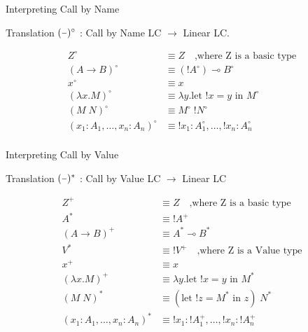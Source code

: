 \documentclass[10pt]{beamer}
\newcommand{\lam}[2]{\lambda #1 . #2}
\newcommand{\llet}[3]{\text{let }  ! #1 = #2 \text{ in } #3}
\newcommand{\app}[2]{#1 \; #2}
\newcommand{\minus}{\scalebox{0.75}[1.0]{$-$}}
\begin{document}
\begin{frame}[fragile]{Interpreting Call by Name}
  \begin{alertblock}{Translation}
    $(\minus)^\circ$ : Call by Name LC $\to$ Linear LC. \\
  \end{alertblock}

  \begin{align*}
    Z^\circ                             & \equiv Z \quad \text{,where Z is a basic type}     \\
    (A \rightarrow B)^\circ             & \equiv (! A^\circ) \multimap B^\circ               \\
    x^\circ                             & \equiv x                                           \\
    (\lam{x}{M})^\circ                  & \equiv \lam{y}{\llet{x}{y}{M^\circ}}               \\
    (\app{M}{N})^\circ                  & \equiv \app{M^\circ}{! N^\circ}                    \\
    (x_1 : A_1, \dots, x_n : A_n)^\circ & \equiv ! x_1 : A_1^\circ, \dots, ! x_n : A_n^\circ \\
  \end{align*}

\end{frame}

\begin{frame}[fragile]{Interpreting Call by Value}
  \begin{alertblock}{Translation}
    $(\minus)^*$ : Call by Value LC $\to$ Linear LC\\
  \end{alertblock}

  \begin{align*}
    Z^+                             & \equiv Z \quad \text{,where Z is a basic type}     \\
    A^*                             & \equiv ! A^+                                       \\
    (A \rightarrow B)^+             & \equiv A^* \multimap B^*                           \\
    V^*                             & \equiv ! V^+ \quad \text{,where Z is a Value type} \\
    x^+                             & \equiv x                                           \\
    (\lam{x}{M})^+                  & \equiv \lam{y}{\llet{x}{y}{M^*}}                   \\
    (\app{M}{N})^*                  & \equiv \app{(\llet{z}{M^*}{z})}{N^*}               \\
    (x_1 : A_1, \dots, x_n : A_n)^* & \equiv ! x_1 : ! A_1^+, \dots, ! x_n : ! A_n^+     \\
  \end{align*}
\end{frame}
\end{document}
